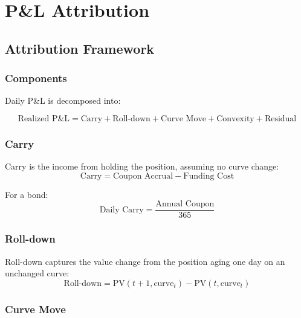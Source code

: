 \documentclass[12pt,a4paper]{report}
\newcommand{\pv}{\text{PV}}
\begin{document}
\chapter{P\&L Attribution}

\section{Attribution Framework}

\subsection{Components}

Daily P\&L is decomposed into:

\begin{equation}
    \text{Realized P\&L} = \text{Carry} + \text{Roll-down} + \text{Curve Move} + \text{Convexity} + \text{Residual}
\end{equation}

\subsection{Carry}

Carry is the income from holding the position, assuming no curve change:
\begin{equation}
    \text{Carry} = \text{Coupon Accrual} - \text{Funding Cost}
\end{equation}

For a bond:
\begin{equation}
    \text{Daily Carry} = \frac{\text{Annual Coupon}}{365}
\end{equation}

\subsection{Roll-down}

Roll-down captures the value change from the position aging one day on an unchanged curve:
\begin{equation}
    \text{Roll-down} = \pv(t+1, \text{curve}_t) - \pv(t, \text{curve}_t)
\end{equation}

\subsection{Curve Move}
\end{document}

